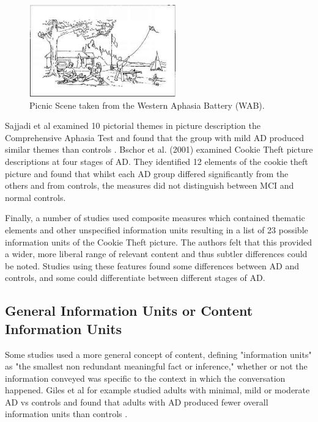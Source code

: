 \documentclass[10pt, letterpaper, twoside, openany]{book}
\begin{document}
\begin{figure}[H]
\centering
\includegraphics[width=240px, height=150px]{images/picnic-scene.jpg}
\caption{Picnic Scene taken from the Western Aphasia Battery (WAB).\label{white}}
\end{figure}
Sajjadi et al examined 10 pictorial themes in picture description the Comprehensive Aphasia Test and found that the group with mild AD produced similar themes than controls \cite{Sajjadi2012}. Bschor et al. (2001) examined Cookie Theft picture descriptions at four stages of AD. They identified 12 elements of the cookie theft picture and found that whilst each AD group differed significantly from the others and from controls, the measures did not distinguish between MCI and normal controls.
\par
Finally, a number of studies used composite measures which contained thematic elements and other unspecified information units resulting in a list of 23 possible information units of the Cookie Theft picture. The authors felt that this provided a wider, more liberal range of relevant content and thus subtler differences could be noted. Studies using these features found some differences between AD and controls, and some could differentiate between different stages of AD.
\subsection{General Information Units or Content Information Units}
Some studies used a more general concept of content, defining "information units" as "the smallest non redundant meaningful fact or inference," whether or not the information conveyed was specific to the context in which the conversation happened. Giles et al for example studied adults with minimal, mild or moderate AD vs controls and found that adults with AD produced fewer overall information units than controls \cite{Giles1996}.
\end{document}
